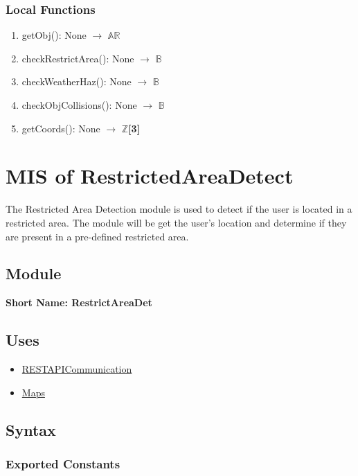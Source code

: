 \documentclass[12pt, titlepage]{article}
\begin{document}
\subsubsection{Local Functions}

\begin{enumerate}
  \item getObj(): None $\rightarrow$ $\mathbb{AR}$
  \item checkRestrictArea(): None $\rightarrow$ $\mathbb{B}$
  \item checkWeatherHaz(): None $\rightarrow$ $\mathbb{B}$
  \item checkObjCollisions(): None $\rightarrow$ $\mathbb{B}$
  \item getCoords(): None $\rightarrow$ $\mathbb{Z}$\textbf{[3]}
\end{enumerate}

\section{MIS of RestrictedAreaDetect} \label{rest-area}

The Restricted Area Detection module is used to detect if the user is located in a restricted area. The module will be get the user's location and determine if they are present in a pre-defined restricted area.

\subsection{Module}

\textbf{Short Name: RestrictAreaDet}

\subsection{Uses}
\begin{itemize}
  \item \hyperref[rest-api]{RESTAPICommunication}
  \item \hyperref[maps]{Maps}
\end{itemize}

\subsection{Syntax}

\subsubsection{Exported Constants}
\end{document}
